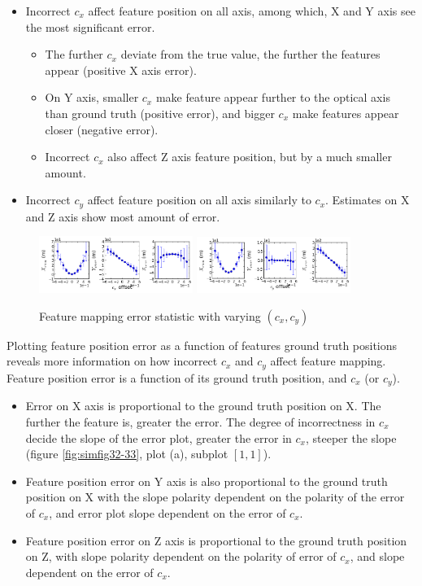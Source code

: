 \begin{itemize}
  \item Incorrect $c_{x}$ affect feature position on all axis, among
  which, X and Y axis see the most significant error.
  \begin{itemize}
    \item The further $c_{x}$ deviate from the true value, the further
    the features appear (positive X axis error).
    \item On Y axis, smaller $c_{x}$ make feature appear further to
    the optical axis than ground truth (positive error), and bigger
    $c_{x}$ make features appear closer (negative error).
    \item Incorrect $c_{x}$ also affect Z axis feature position, but
    by a much smaller amount.
  \end{itemize}
  \item Incorrect $c_{y}$ affect feature position on all axis
  similarly to $c_{x}$. Estimates on X and Z axis show most amount of
  error.
\end{itemize}

\begin{figure}[h]
  \centering
  \includegraphics[width=5cm, keepaspectratio=true]{./Figures/SimulationFigures/Figure28.png}
  \includegraphics[width=5cm, keepaspectratio=true]{./Figures/SimulationFigures/Figure29.png}
  \caption{Feature mapping error statistic with varying $(c_x, c_y)$}
  \label{fig:simfig28-29}
\end{figure}

Plotting feature position error as a function of features ground truth 
positions reveals more information on how incorrect $c_{x}$ and $
c_{y}$ affect feature mapping. Feature position error is a function of 
its ground truth position, and $c_{x}$ (or $c_{y}$). 

\begin{itemize}
  \item Error on X axis is proportional to the ground truth position
  on X. The further the feature is, greater the error. The degree of
  incorrectness in $c_{x}$ decide the slope of the error plot, greater
  the error in $c_{x}$, steeper the slope (figure
  \ref{fig:simfig32-33}, plot (a), subplot $[1,1]$).
  \item Feature position error on Y axis is also proportional to the
  ground truth position on X with the slope polarity dependent on the
  polarity of the error of $c_{x}$, and error plot slope dependent on
  the error of $c_{x}$.
  \item Feature position error on Z axis is proportional to the ground
  truth position on Z, with slope polarity dependent on the polarity
  of error of $c_{x}$, and slope dependent on the error of $c_{x}$.
\end{itemize}


